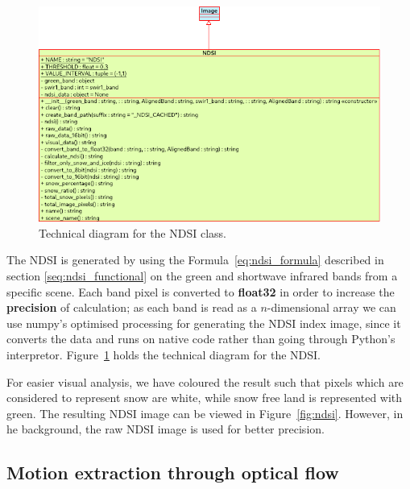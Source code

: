 \documentclass[12pt, a4paper]{report}
\begin{document}
	\begin{figure}[h!]
		\centering
		\includegraphics[scale=0.7]{../images/ndsi_diagram.png}
		\caption{Technical diagram for the NDSI class.}
		\label{fig:ndsi_diagram}
	\end{figure}

	\par The NDSI is generated by using the Formula~\ref{eq:ndsi_formula} described in section \ref{seq:ndsi_functional} on the green and shortwave infrared bands from a specific scene. Each band pixel is converted to \textbf{float32} in order to increase the \textbf{precision} of calculation; as each band is read as a $n$-dimensional array we can use numpy's optimised processing for generating the NDSI index image, since it converts the data and runs on native code rather than going through Python's interpretor. Figure~\ref{fig:ndsi_diagram} holds the technical diagram for the NDSI.
	
	\par For easier visual analysis, we have coloured the result such that pixels which are considered to represent snow are white, while snow free land is represented with green. The resulting NDSI image can be viewed in Figure~\ref{fig:ndsi}. However, in he background, the raw NDSI image is used for better precision.


	\subsection{Motion extraction through optical flow}
	\label{motion_ndsi_implementation}
	
\end{document}
